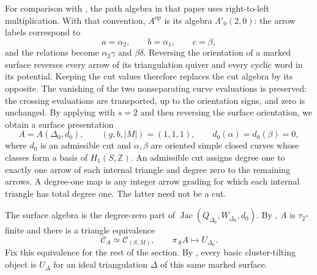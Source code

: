 \documentclass[12pt,a4paper,english,reqno]{amsart}
\theoremstyle{plain}
\theoremstyle{definition}
\numberwithin{equation}{section}
\def\al{\alpha}
\def\be{\beta}
\def\ga{\gamma}
\def\de{\delta}
\def\ta{\tau}
\def\De{\Delta}
\def\La{\Lambda}
\def\calC{{\mathcal C}}
\def\bbZ{{\mathbb Z}}
\def\Jac{\operatorname{Jac}}
\begin{document}
For comparison with \cite[Section 4]{AmiotTorus}, the path algebra in that paper uses right-to-left multiplication. With that convention, $A^{\mathrm{op}}$ is its algebra $\La'_0(2,0)$: the arrow labels correspond to
\[
 a=\al_2,\qquad b=\al_1,\qquad c=\be,
\]
and the relations become $\al_2\ga$ and $\be\de$. Reversing the orientation of a marked surface reverses every arrow of its triangulation quiver and every cyclic word in its potential. Keeping the cut values therefore replaces the cut algebra by its opposite. The vanishing of the two nonseparating curve evaluations is preserved: the crossing evaluations are transported, up to the orientation signs, and zero is unchanged. By applying \cite[Proposition 4.3(1), its proof and Figure 4.1]{AmiotTorus} with $s=2$ and then reversing the surface orientation, we obtain a surface presentation
\begin{equation}
 A=A(\De_0,d_0),\qquad
 (g,b,|M|)=(1,1,1),\qquad d_0(\al)=d_0(\be)=0,
 \label{eq:torus-base}
\end{equation}
where $d_0$ is an admissible cut and $\al,\be$ are oriented simple closed curves whose classes form a basis of $H_1(S,\bbZ)$. An admissible cut assigns degree one to exactly one arrow of each internal triangle and degree zero to the remaining arrows. A degree-one map is any integer arrow grading for which each internal triangle has total degree one. The latter need not be a cut.

The surface algebra is the degree-zero part of $\Jac(Q_{\De_0},W_{\De_0},d_0)$. By \cite[Theorem 3.7]{AGSurface}, $A$ is $\ta_2$-finite and there is a triangle equivalence
\[
 \calC_A\simeq\calC_{(S,M)},\qquad \pi_A A\longmapsto U_{\De_0}.
\]
Fix this equivalence for the rest of the section. By \cite[Corollary 1.7]{BZ}, every basic cluster-tilting object is $U_\De$ for an ideal triangulation $\De$ of this same marked surface.
\end{document}
